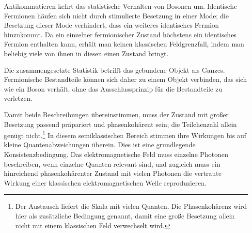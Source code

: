 Antikommutieren kehrt das statistische Verhalten von Bosonen um. Identische Fermionen häufen sich nicht durch stimulierte Besetzung in einer Mode; die Besetzung dieser Mode verhindert, dass ein weiteres identisches Fermion hinzukommt. Da ein einzelner fermionischer Zustand höchstens ein identisches Fermion enthalten kann, erhält man keinen klassischen Feldgrenzfall, indem man beliebig viele von ihnen in diesen einen Zustand bringt.

\begin{classroomqa}
\end{classroomqa}

Die zusammengesetzte Statistik betrifft das gebundene Objekt als Ganzes. Fermionische Bestandteile können sich daher zu einem Objekt verbinden, das sich wie ein Boson verhält, ohne das Ausschlussprinzip für die Bestandteile zu verletzen.

\begin{classroomqa}
\end{classroomqa}

Damit beide Beschreibungen übereinstimmen, muss der Zustand mit großer Besetzung passend präpariert und phasenkohärent sein; die Teilchenzahl allein genügt nicht.\footnote{Der Austausch liefert die Skala mit vielen Quanten. Die Phasenkohärenz wird hier als zusätzliche Bedingung genannt, damit eine große Besetzung allein nicht mit einem klassischen Feld verwechselt wird.} In diesem semiklassischen Bereich stimmen ihre Wirkungen bis auf kleine Quantenabweichungen überein. Dies ist eine grundlegende Konsistenzbedingung. Das elektromagnetische Feld muss einzelne Photonen beschreiben, wenn einzelne Quanten relevant sind, und zugleich muss ein hinreichend phasenkohärenter Zustand mit vielen Photonen die vertraute Wirkung einer klassischen elektromagnetischen Welle reproduzieren.